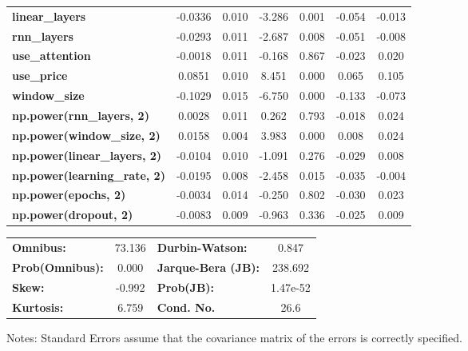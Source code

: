 \begin{center}
\begin{tabular}{lcccccc}
\textbf{linear\_layers}              &      -0.0336  &        0.010     &    -3.286  &         0.001        &       -0.054    &       -0.013     \\
\textbf{rnn\_layers}                 &      -0.0293  &        0.011     &    -2.687  &         0.008        &       -0.051    &       -0.008     \\
\textbf{use\_attention}              &      -0.0018  &        0.011     &    -0.168  &         0.867        &       -0.023    &        0.020     \\
\textbf{use\_price}                  &       0.0851  &        0.010     &     8.451  &         0.000        &        0.065    &        0.105     \\
\textbf{window\_size}                &      -0.1029  &        0.015     &    -6.750  &         0.000        &       -0.133    &       -0.073     \\
\textbf{np.power(rnn\_layers, 2)}    &       0.0028  &        0.011     &     0.262  &         0.793        &       -0.018    &        0.024     \\
\textbf{np.power(window\_size, 2)}   &       0.0158  &        0.004     &     3.983  &         0.000        &        0.008    &        0.024     \\
\textbf{np.power(linear\_layers, 2)} &      -0.0104  &        0.010     &    -1.091  &         0.276        &       -0.029    &        0.008     \\
\textbf{np.power(learning\_rate, 2)} &      -0.0195  &        0.008     &    -2.458  &         0.015        &       -0.035    &       -0.004     \\
\textbf{np.power(epochs, 2)}         &      -0.0034  &        0.014     &    -0.250  &         0.802        &       -0.030    &        0.023     \\
\textbf{np.power(dropout, 2)}        &      -0.0083  &        0.009     &    -0.963  &         0.336        &       -0.025    &        0.009     \\
\bottomrule
\end{tabular}
\begin{tabular}{lclc}
\textbf{Omnibus:}       & 73.136 & \textbf{  Durbin-Watson:     } &    0.847  \\
\textbf{Prob(Omnibus):} &  0.000 & \textbf{  Jarque-Bera (JB):  } &  238.692  \\
\textbf{Skew:}          & -0.992 & \textbf{  Prob(JB):          } & 1.47e-52  \\
\textbf{Kurtosis:}      &  6.759 & \textbf{  Cond. No.          } &     26.6  \\
\bottomrule
\end{tabular}
\end{center}

Notes: \newline
 [1] Standard Errors assume that the covariance matrix of the errors is correctly specified.